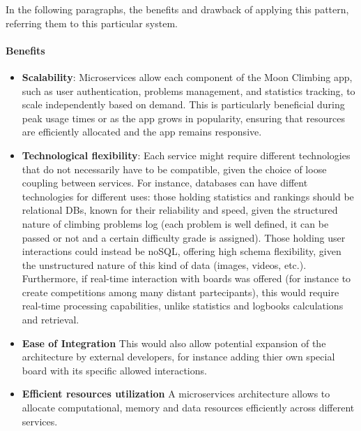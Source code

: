 \documentclass{article}
\begin{document}
In the following paragraphs, the benefits and drawback of applying this pattern, referring them to this particular system.
\paragraph*{Benefits}
\begin{itemize}
    \item \textbf{Scalability}:
    Microservices allow each component of the Moon Climbing app, such as user authentication, problems management, and statistics tracking, to scale independently based on demand. This is particularly beneficial during peak usage times or as the app grows in popularity, ensuring that resources are efficiently allocated and the app remains responsive.    
    \item \textbf{Technological flexibility}:
    Each service might require different technologies that do not necessarily have to be compatible, given the choice of loose coupling between services. For instance, databases can have diffent technologies for different uses: those holding statistics and rankings should be relational DBs, known for their reliability and speed, given the structured nature of climbing problems log (each problem is well defined, it can be passed or not and a certain difficulty grade is assigned). Those holding user interactions could instead be noSQL, offering high schema flexibility, given the unstructured nature of this kind of data (images, videos, etc.).
    Furthermore, if real-time interaction with boards was offered (for instance to create competitions among many distant partecipants), this would require real-time processing capabilities, unlike statistics and logbooks calculations and retrieval.
    \item \textbf{Ease of Integration}
    This would also allow potential expansion of the architecture by external developers, for instance adding thier own special board with its specific allowed interactions.
    \item \textbf{Efficient resources utilization}
    A microservices architecture allows to allocate computational, memory and data resources efficiently across different services.
\end{itemize}
\end{document}
